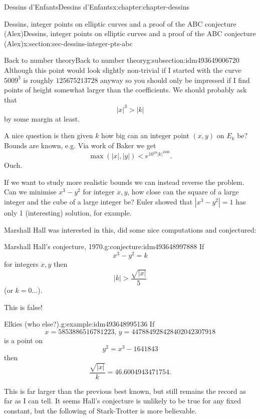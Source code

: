 \documentclass[oneside,10pt,]{book}
\numberwithin{equation}{section}
\newcommand{\lt}{<}
\newcommand{\gt}{>}
\begin{document}
\begin{chapterptx}{Dessins d'Enfants}{}{Dessins d'Enfants}{}{}{x:chapter:chapter-dessins}
\begin{sectionptx}{Dessins, integer points on elliptic curves and a proof of the ABC conjecture (Alex)}{}{Dessins, integer points on elliptic curves and a proof of the ABC conjecture (Alex)}{}{}{x:section:sec-dessins-integer-pts-abc}
\begin{subsectionptx}{Back to number theory}{}{Back to number theory}{}{}{g:subsection:idm493649006720}
Although this point would look slightly non-trivial if I started with the curve \(5009^3\) is roughly \(125675213728\) anyway so you should only be impressed if I find points of height somewhat larger than the coefficients. We should probably ask that%
\begin{equation*}
|x|^3 \gt |k|
\end{equation*}
by some margin at least.%
\par
A nice question is then given \(k\) how big can an integer point \((x,y)\) on \(E_k\) be? Bounds are known, e.g.  Via work of Baker we get%
\begin{equation*}
\max(|x|, |y|) \lt e^{10^{10}|k|^{1000}}\text{.}
\end{equation*}
Ouch.%
\par
If we want to study more realistic bounds we can instead reverse the problem. Can we minimise \(x^3 - y^2\) for integer \(x,y\), how close can the square of a large integer and the cube of a large integer be? Euler showed that \(|x^3 - y^2| = 1\) has only 1 (interesting) solution, for example.%
\par
Marshall Hall was interested in this, did some nice computations and conjectured:%
\begin{conjecture}{Marshall Hall's conjecture, 1970.}{}{g:conjecture:idm493648997888}%
If%
\begin{equation*}
x^3 - y^2 = k
\end{equation*}
for integers \(x,y\) then%
\begin{equation*}
|k| \gt \frac{\sqrt{|x|}}{5}
\end{equation*}
(or \(k =0\)...).%
\end{conjecture}
This is false!%
\begin{example}{Elkies (who else?).}{g:example:idm493648995136}%
If%
\begin{equation*}
x= 5853886516781223,\,y = 447884928428402042307918
\end{equation*}
is a point on%
\begin{equation*}
y^2 = x^3 - 1641843
\end{equation*}
then%
\begin{equation*}
\frac{\sqrt{|x|}}{k} = 46.6004943471754\text{.}
\end{equation*}
%
\end{example}
This is far larger than the previous best known, but still remains the record as far as I can tell. It seems Hall's conjecture is unlikely to be true for any fixed constant, but the following of Stark-Trotter is more believable.%

\end{subsectionptx}
\end{sectionptx}
\end{chapterptx}
\end{document}
